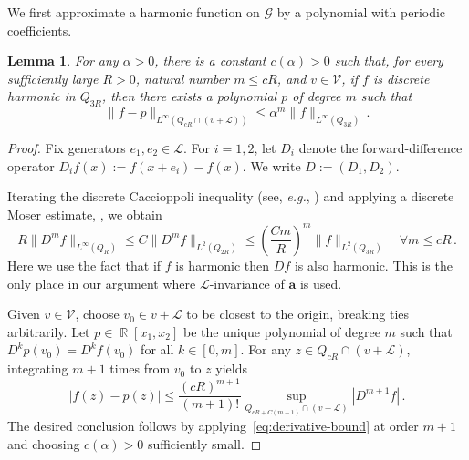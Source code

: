 \documentclass{daj}
\newtheorem{lemma}[theorem]{Lemma}
\newcommand{\G}{\mathcal{G}}
\newcommand{\V}{\mathcal{V}}
\newcommand{\cond}{\mathbf{a}}
\DeclareMathOperator{\R}{\mathbb{R}}
\newcommand{\eg}{{\it e.g.}}
\begin{document}
We first approximate a harmonic function on $\G$ by a polynomial with periodic coefficients.
\begin{lemma}
	\label{lemma:poly-approx}
	For any $\alpha > 0$, there is a constant $c(\alpha) > 0$ such that, for every sufficiently large $R > 0$, natural number $m \leq c R$, and $v \in \V$, if $f$ is discrete harmonic in $Q_{3 R}$, then there exists a polynomial $p$ of degree $m$ such that
	\begin{equation}
		\label{eq:poly-approx}
		\|f-p\|_{L^\infty(Q_{cR} \cap (v + \mathcal{L}))} \leq \alpha^m \|f\|_{L^\infty(Q_{3 R})} \, .
	\end{equation}
\end{lemma}
\begin{proof}
	Fix generators $e_1, e_2 \in \mathcal{L}$. For $i=1,2$, let $D_i$ denote the forward-difference operator
	$D_i f (x) := f(x+e_i)-f(x) $.
	We write $D := (D_1, D_2)$.
	
	Iterating the discrete Caccioppoli inequality (see, \eg, \cite[Proposition 12]{MR3395463}) 
	and applying a discrete Moser estimate, \cite[Proposition 5.3]{MR1425544}, we obtain
	\begin{equation}
		\label{eq:derivative-bound}
		R \|D^m f \|_{L^\infty(Q_R)} \leq C \|D^m f \|_{L^2(Q_{2 R})} \leq {\left(\frac{Cm}{R}\right)}^m\| f \|_{L^2(Q_{3R})} \quad \forall m \leq c R \, .
	\end{equation}
	Here we use the fact that if $f $ is harmonic then $D f$ is also harmonic. This is the only place in our argument where $\mathcal{L}$-invariance of $\cond$ is used.
	
	Given $v \in \V$, choose $v_0 \in v + \mathcal{L}$ to be closest to the origin, breaking ties arbitrarily. Let $p \in \R[x_1, x_2]$ be the unique polynomial of degree $m$ such that
	$D^k p(v_0) = D^k f(v_0)$ for all $k \in [0, m]$.
	For any $z \in Q_{cR} \cap (v + \mathcal{L})$, integrating $m+1$ times from $v_0$ to $z$ yields
	\begin{equation*}
		|f(z)-p(z)| \leq \frac{{\left(cR\right)}^{m+1}}{(m+1)!} \sup_{Q_{cR + C(m + 1)} \cap (v + \mathcal{L})}|D^{m+1} f | \, .
	\end{equation*}
	The desired conclusion follows by applying~\eqref{eq:derivative-bound} at order $m+1$ and choosing $c(\alpha) > 0$ sufficiently small.
\end{proof}
\end{document}
